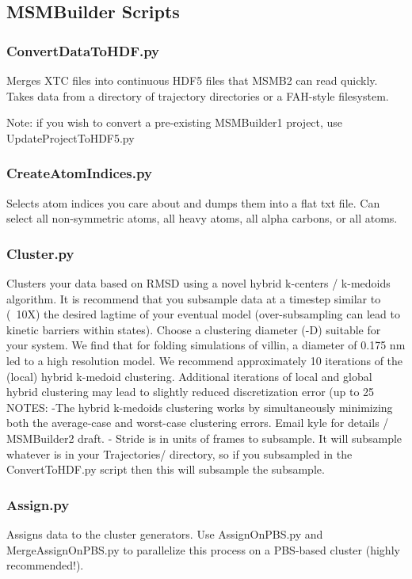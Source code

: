 \documentclass[12pt]{article}
\begin{document}
\subsection{MSMBuilder Scripts}
\subsubsection{ConvertDataToHDF.py}

Merges XTC files into continuous HDF5 files that MSMB2 can read quickly.  Takes data from a directory of trajectory directories or a FAH-style filesystem.  

Note: if you wish to convert a pre-existing MSMBuilder1 project, use UpdateProjectToHDF5.py 

\subsubsection{CreateAtomIndices.py}
Selects atom indices you care about and dumps them into a flat txt file. Can select all non-symmetric atoms, all heavy atoms, all alpha carbons, or all atoms.

\subsubsection{Cluster.py}
Clusters your data based on RMSD using a novel hybrid k-centers / k-medoids algorithm. It is recommend that you subsample data at a timestep similar to (~10X) the desired lagtime of your eventual model (over-subsampling can lead to kinetic barriers within states). Choose a clustering diameter (-D) suitable for your system.  We find that for folding simulations of villin, a diameter of 0.175 nm led to a high resolution model.  We recommend approximately 10 iterations of the (local) hybrid k-medoid clustering.  Additional iterations of local and global hybrid clustering may lead to slightly reduced discretization error (up to 25%
	NOTES:
-The hybrid k-medoids clustering works by simultaneously minimizing both the average-case and worst-case clustering errors.  Email kyle for details / MSMBuilder2 draft.
- Stride is in units of frames to subsample. It will subsample whatever is in your Trajectories/ directory, so if you subsampled in the ConvertToHDF.py script then this will subsample the subsample.

\subsubsection{Assign.py}
Assigns data to the cluster generators. Use AssignOnPBS.py and MergeAssignOnPBS.py to parallelize this process on a PBS-based cluster (highly recommended!).
\end{document}
